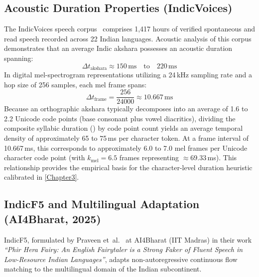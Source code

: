 \subsection{Acoustic Duration Properties (IndicVoices)}
The IndicVoices speech corpus~\cite{indicvoices2024} comprises 1,417 hours of verified spontaneous and read speech recorded across 22 Indian languages. Acoustic analysis of this corpus demonstrates that an average Indic akshara possesses an acoustic duration spanning:
\begin{equation}
    \Delta t_{\text{akshara}} \approx 150\,\text{ms} \quad \text{to} \quad 220\,\text{ms}
    \label{eq:akshara_duration}
\end{equation}
In digital mel-spectrogram representations utilizing a 24\,kHz sampling rate and a hop size of 256 samples, each mel frame spans:
\begin{equation}
    \Delta t_{\text{frame}} = \frac{256}{24000} \approx 10.667\,\text{ms}
    \label{eq:frame_duration}
\end{equation}
Because an orthographic akshara typically decomposes into an average of 1.6 to 2.2 Unicode code points (base consonant plus vowel diacritics), dividing the composite syllabic duration () by code point count yields an average temporal density of approximately 65 to 75\,ms per character token. At a frame interval of 10.667\,ms, this corresponds to approximately 6.0 to 7.0 mel frames per Unicode character code point (with $k_{\text{mel}} = 6.5$ frames representing $\approx 69.33$\,ms). This relationship provides the empirical basis for the character-level duration heuristic calibrated in \cref{Chapter3}.

\subsection{IndicF5 and Multilingual Adaptation (AI4Bharat, 2025)}
\label{subsec:indicf5_phir_hera}
IndicF5, formulated by Praveen et~al.~\cite{indicf52025} at AI4Bharat (IIT Madras) in their work \textit{``Phir Hera Fairy: An English Fairytaler is a Strong Faker of Fluent Speech in Low-Resource Indian Languages''}, adapts non-autoregressive continuous flow matching to the multilingual domain of the Indian subcontinent.

